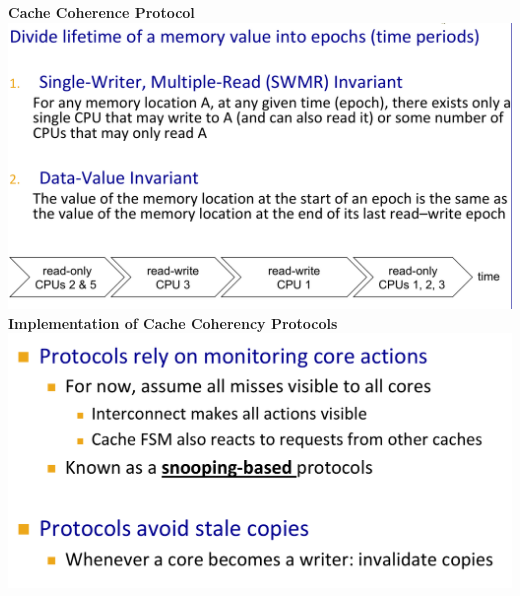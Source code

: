 \textbf{Cache Coherence Protocol} \\
\includegraphics[width=\linewidth]{png/cc.png}
\textbf{Implementation of Cache Coherency Protocols}\\
\includegraphics[width=\linewidth]{png/proto.png}
\vfill\null
\columnbreak

